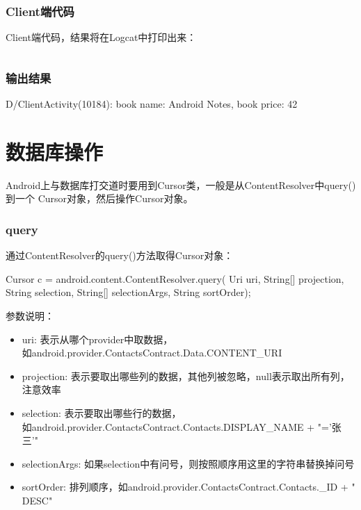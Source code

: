 ﻿\documentclass[a4paper,11pt]{article}
\begin{document}
  \subsubsection[Client端代码]{Client端代码}
  Client端代码，结果将在Logcat中打印出来：\par
  \inputminted[linenos,tabsize=4,bgcolor=srcbg]{java}{srcdir/ClientActivity.java}

  \subsubsection[输出结果]{输出结果}
  \begin{bashcode}
D/ClientActivity(10184): book name: Android Notes, book price: 42
  \end{bashcode}

\section[数据库操作]{数据库操作}
Android上与数据库打交道时要用到Cursor类，一般是从ContentResolver中query()到一个
Cursor对象，然后操作Cursor对象。

\subsubsection[query]{query}
通过ContentResolver的query()方法取得Cursor对象：

\begin{javacode}
Cursor c = android.content.ContentResolver.query(
    Uri uri,
    String[] projection,
    String selection,
    String[] selectionArgs,
    String sortOrder);
\end{javacode}

参数说明：

\begin{itemize}
\item uri: 表示从哪个provider中取数据，\\如android.provider.ContactsContract.Data.CONTENT\_URI
\item projection: 表示要取出哪些列的数据，其他列被忽略，null表示取出所有列，注意效率
\item selection: 表示要取出哪些行的数据，\\如android.provider.ContactsContract.Contacts.DISPLAY\_NAME + "='张三'"
\item selectionArgs: 如果selection中有问号，则按照顺序用这里的字符串替换掉问号
\item sortOrder: 排列顺序，如android.provider.ContactsContract.Contacts.\_ID + " DESC"
\end{itemize}
\end{document}
